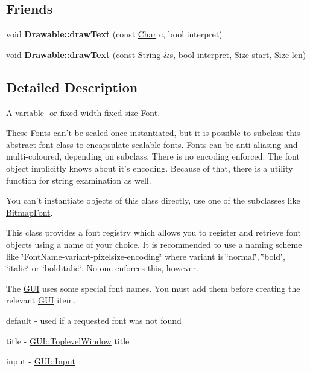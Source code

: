 \subsection*{Friends}
\begin{DoxyCompactItemize}
\item 
\hypertarget{classGUI_1_1Font_a6bf8da18a30063bef1fa6a2b126b090d}{void {\bfseries Drawable\-::draw\-Text} (const \hyperlink{namespaceGUI_af6b04b46d40197b4f00e553d7d1a3e4c}{Char} c, bool interpret)}\label{classGUI_1_1Font_a6bf8da18a30063bef1fa6a2b126b090d}

\item 
\hypertarget{classGUI_1_1Font_aa979e0a4c03e5f475ebf93556e35f8e9}{void {\bfseries Drawable\-::draw\-Text} (const \hyperlink{classGUI_1_1String}{String} \&s, bool interpret, \hyperlink{namespaceGUI_a10b6232e08729baa0bd211a86a69ce36}{Size} start, \hyperlink{namespaceGUI_a10b6232e08729baa0bd211a86a69ce36}{Size} len)}\label{classGUI_1_1Font_aa979e0a4c03e5f475ebf93556e35f8e9}

\end{DoxyCompactItemize}


\subsection{Detailed Description}
A variable-\/ or fixed-\/width fixed-\/size \hyperlink{classGUI_1_1Font}{Font}. 

These Fonts can't be scaled once instantiated, but it is possible to subclass this abstract font class to encapsulate scalable fonts. Fonts can be anti-\/aliasing and multi-\/coloured, depending on subclass. There is no encoding enforced. The font object implicitly knows about it's encoding. Because of that, there is a utility function for string examination as well.

You can't instantiate objects of this class directly, use one of the subclasses like \hyperlink{classGUI_1_1BitmapFont}{Bitmap\-Font}.

This class provides a font registry which allows you to register and retrieve font objects using a name of your choice. It is recommended to use a naming scheme like \char`\"{}\-Font\-Name-\/variant-\/pixelsize-\/encoding\char`\"{} where variant is \char`\"{}normal\char`\"{}, \char`\"{}bold\char`\"{}, \char`\"{}italic\char`\"{} or \char`\"{}bolditalic\char`\"{}. No one enforces this, however.

The \hyperlink{namespaceGUI}{G\-U\-I} uses some special font names. You must add them before creating the relevant \hyperlink{namespaceGUI}{G\-U\-I} item. \begin{DoxyItemize}
\item {\ttfamily default} -\/ used if a requested font was not found \item {\ttfamily title} -\/ \hyperlink{classGUI_1_1ToplevelWindow}{G\-U\-I\-::\-Toplevel\-Window} title \item {\ttfamily input} -\/ \hyperlink{classGUI_1_1Input}{G\-U\-I\-::\-Input} \end{DoxyItemize}


